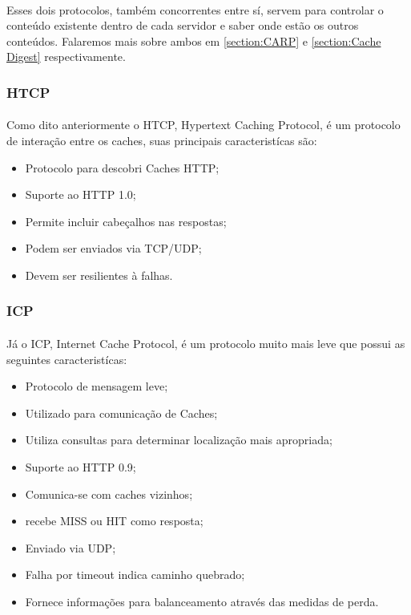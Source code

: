 \paragraph{} Esses dois protocolos, tamb\'em concorrentes entre s\'i, servem para controlar o conte\'udo existente dentro de cada servidor e saber onde est\~ao os outros conte\'udos. Falaremos mais sobre ambos em \ref{section:CARP} e \ref{section:Cache Digest} respectivamente.

\subsubsection{HTCP}
\label{section:HTCP}
\paragraph{} Como dito anteriormente o HTCP, Hypertext Caching Protocol, \'e um protocolo de intera\c{c}\~ao entre os caches, suas principais caracterist\'icas s\~ao:
\begin{itemize}
\item Protocolo para descobri Caches HTTP;
\item Suporte ao HTTP 1.0;
\item Permite incluir cabeçalhos nas respostas;
\item Podem ser enviados via TCP/UDP;
\item Devem ser resilientes \`a falhas.
\end{itemize}

\subsubsection{ICP}
\label{section:ICP}
\paragraph{} J\'a o ICP, Internet Cache Protocol, \'e um protocolo muito mais leve que possui as seguintes caracterist\'icas:
\begin{itemize}
\item Protocolo de mensagem leve;
\item Utilizado para comunica\c{c}\~ao de Caches;
\item Utiliza consultas para determinar localiza\c{c}\~ao mais apropriada;
\item Suporte ao HTTP 0.9;
\item Comunica-se com caches vizinhos;
\item recebe MISS ou HIT como resposta;
\item Enviado via UDP;
\item Falha por timeout indica caminho quebrado;
\item Fornece informa\c{c}\~oes para balanceamento atrav\'es das medidas de perda.
\end{itemize}

